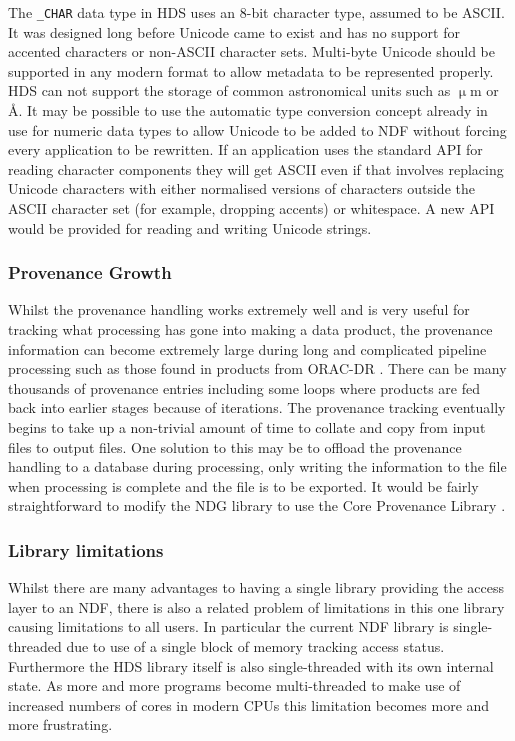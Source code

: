\documentclass[final,authoryear,5p,times,twocolumn]{elsarticle}
\begin{document}
The \texttt{\_CHAR} data type in HDS uses an 8-bit character type,
assumed to be ASCII. It was designed long before Unicode came to exist
and has no support for accented characters or non-ASCII character
sets. Multi-byte Unicode should be supported in any modern format to
allow metadata to be represented properly. HDS can not support the
storage of common astronomical units such as $\upmu$m or \AA.
It may be possible to use the automatic type conversion concept
already in use for numeric data types
to allow Unicode to be added to NDF without forcing every application
to be rewritten. If an application uses the standard API for reading character
components they will get ASCII even if that involves replacing Unicode
characters with either normalised versions of characters outside the
ASCII character set (for example, dropping accents) or whitespace. A new API
would be provided for reading and writing Unicode strings.

\subsubsection{Provenance Growth}

Whilst the provenance handling works extremely well and is very useful
for tracking what processing has gone into making a data product, the
provenance information can become extremely large during long and
complicated pipeline processing such as those found in products from
ORAC-DR \citep{2008AN....329..295C}.  There can be many thousands of
provenance entries including some loops where products are fed back
into earlier stages because of iterations.  The provenance tracking
eventually begins to take up a non-trivial amount of time to collate
and copy from input files to output files. One solution to this may be
to offload the provenance handling to a database during processing,
only writing the information to the file when processing is complete
and the file is to be exported. It would be fairly straightforward to
modify the NDG library to use the Core Provenance Library
\citep{Macko:2012:GPL:2342875.2342881}.

\subsubsection{Library limitations}

Whilst there are many advantages to having a single library
providing the access layer to an NDF, there is also a related problem
of limitations in this one library causing limitations to all
users. In particular the current NDF library is single-threaded due to
use of a single block of memory tracking access status. Furthermore
the HDS library itself is also single-threaded with its own internal
state. As more and more programs become multi-threaded to make use of
increased numbers of cores in modern CPUs this limitation becomes more
and more frustrating.
\end{document}
